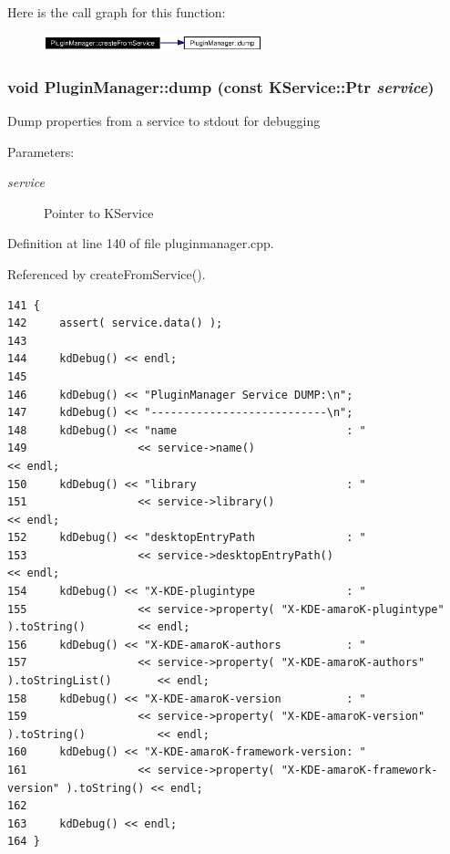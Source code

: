 Here is the call graph for this function:\begin{figure}[H]
\begin{center}
\leavevmode
\includegraphics[width=180pt]{classPluginManager_PluginManagere2_cgraph}
\end{center}
\end{figure}
\subsubsection{\setlength{\rightskip}{0pt plus 5cm}void Plugin\-Manager::dump (const KService::Ptr {\em service})\hspace{0.3cm}{\tt  [static]}}\label{classPluginManager_PluginManagere5}


Dump properties from a service to stdout for debugging \begin{Desc}
\item[Parameters:]
\begin{description}
\item[{\em service}]Pointer to KService \end{description}
\end{Desc}


Definition at line 140 of file pluginmanager.cpp.

Referenced by create\-From\-Service().



\footnotesize\begin{verbatim}141 {
142     assert( service.data() );
143     
144     kdDebug() << endl;
145     
146     kdDebug() << "PluginManager Service DUMP:\n";
147     kdDebug() << "---------------------------\n";
148     kdDebug() << "name                          : "
149                 << service->name()                                                  << endl;
150     kdDebug() << "library                       : "
151                 << service->library()                                               << endl;
152     kdDebug() << "desktopEntryPath              : "
153                 << service->desktopEntryPath()                                      << endl;
154     kdDebug() << "X-KDE-plugintype              : "
155                 << service->property( "X-KDE-amaroK-plugintype" ).toString()        << endl;
156     kdDebug() << "X-KDE-amaroK-authors          : "
157                 << service->property( "X-KDE-amaroK-authors" ).toStringList()       << endl;
158     kdDebug() << "X-KDE-amaroK-version          : "
159                 << service->property( "X-KDE-amaroK-version" ).toString()           << endl;
160     kdDebug() << "X-KDE-amaroK-framework-version: "
161                 << service->property( "X-KDE-amaroK-framework-version" ).toString() << endl;
162     
163     kdDebug() << endl;
164 }
\end{verbatim}\normalsize 
{}
